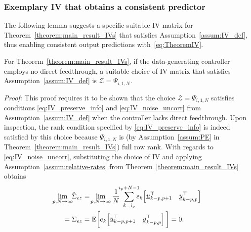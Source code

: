 \subsubsection{Exemplary \acs{IV} that obtains a consistent predictor}\label{sec:example_IV}
\noindent The following lemma suggests a specific suitable \acs{IV} matrix for Theorem~\ref{theorem:main_result_IVs} that satisfies Assumption~\ref{assum:IV_def}, thus enabling consistent output predictions with~\eqref{eq:TheoremIV}.
\setcounter{thm}{1}
\begin{lem}\label{lem:example_IV}
For Theorem~\ref{theorem:main_result_IVs}, if the data-generating controller employs no direct feedthrough, a suitable choice of \acs{IV} matrix that satisfies Assumption~\ref{assum:IV_def} is $\mathcal{Z}=\Psi_{i,1,N}$.%
\end{lem}
\textit{Proof:} This proof requires it to be shown that the choice ${\mathcal{Z}=\Psi_{i,1,N}}$ satisfies conditions \eqref{eq:IV_preserve_info} and \eqref{eq:IV_noise_uncorr} from Assumption~\ref{assum:IV_def} when the controller lacks direct feedthrough. Upon inspection, the rank condition specified by \eqref{eq:IV_preserve_info} is indeed satisfied by this choice because $\Psi_{i,1,N}$ is (by Assumption~\ref{assum:PE} in Theorem~\ref{theorem:main_result_IVs}) full row rank. With regards to \eqref{eq:IV_noise_uncorr}, substituting the choice of \acs{IV} and applying Assumption~\ref{assum:relative-rates} from Theorem~\ref{theorem:main_result_IVs} obtains%
\begin{align}\label{eq:E_Phi_correlation}
    \!\!\!\!\begin{split}
        \lim_{p,N\rightarrow\infty}\!\!\hat{\Sigma}_{ez} &= \!\lim_{p,N\rightarrow\infty}\frac{1}{N}\;\sum\limits_{k=i_p}^{\mathclap{i_p+N-1}} e_k\!\begin{bmatrix}\datavec{u}{k-p,p+1}^\top & \datavec{y}{k-p,p}^\top \end{bmatrix}\\
        =\Sigma_{ez} &=\mathbb{E}\bigg[e_k\!\begin{bmatrix}\datavec{u}{k-p,p+1}^\top & \datavec{y}{k-p,p}^\top \end{bmatrix}\bigg]=0.
    \end{split}
\end{align}
